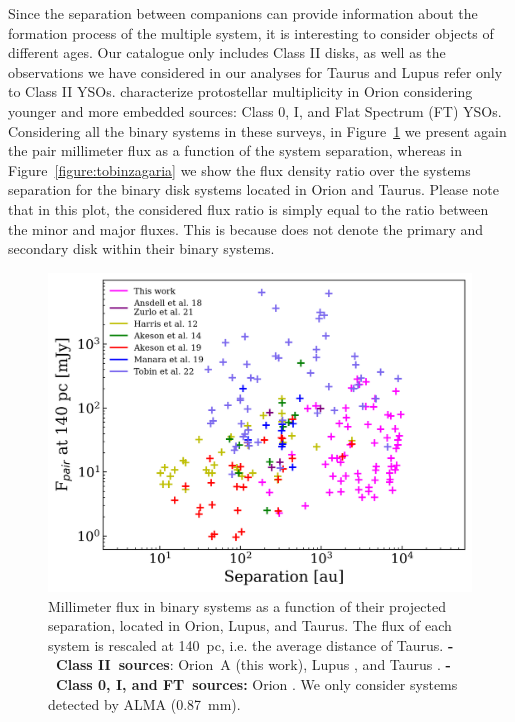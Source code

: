 \documentclass{aa}
\begin{document}
\begin{appendix}
Since the separation between companions can provide information about the formation process of the multiple system, it is interesting to consider objects of different ages. Our catalogue only includes Class II disks, as well as the observations we have considered in our analyses for Taurus and Lupus refer only to Class II YSOs. \cite{Tobin_2022} characterize protostellar multiplicity in Orion considering younger and more embedded sources: Class 0, I, and Flat Spectrum (FT) YSOs. Considering all the binary systems in these surveys, in Figure~\ref{figure:fluxsep1} we present again the pair millimeter flux as a function of the system separation, whereas in Figure~\ref{figure:tobinzagaria} we show the flux density ratio over the systems separation for the binary disk systems located in Orion and Taurus. Please note that in this plot, the considered flux ratio is simply equal to the ratio between the minor and major fluxes. This is because \cite{Tobin_2022} does not denote the primary and secondary disk within their binary systems. 

\begin{figure}[hbt!]
\centering
   \includegraphics[width=\columnwidth]{Zagarialikecomparison.png}
     \caption{Millimeter flux in binary systems as a function of their projected separation, located in Orion, Lupus, and Taurus. The flux of each system is rescaled at 140~pc, i.e. the average distance of Taurus. \textbf{-~Class II~sources}: Orion~A (this work), Lupus \citep{Zurlo21, Ansdell18}, and Taurus \citep{Akeson19, Manara19, Akeson14, Harris_2012}. \textbf{-~Class 0, I, and FT~sources:} Orion \citep{Tobin_2022}. We only consider systems detected by ALMA (0.87~mm).}
     \label{figure:fluxsep1}
\end{figure}


\end{appendix}
\end{document}
